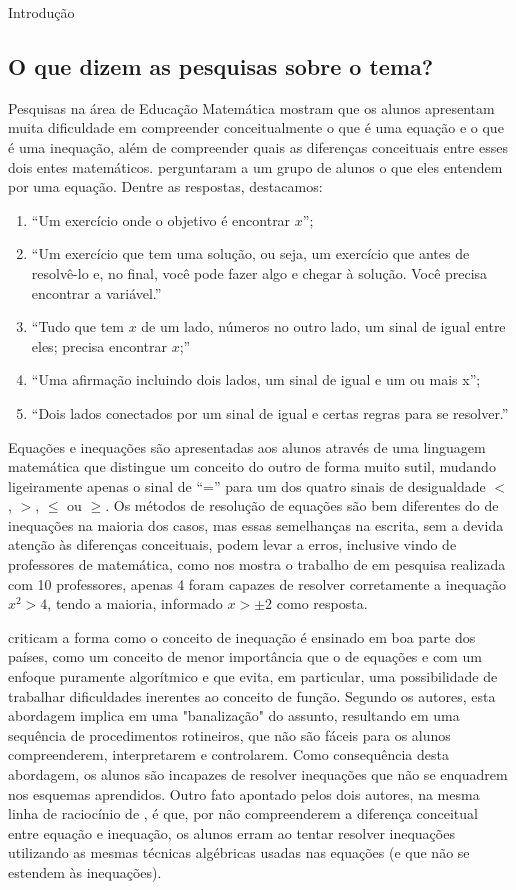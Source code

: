 \begin{apresentacao}{Introdução}
\subsection*{O que dizem as pesquisas sobre o tema?}

Pesquisas na área de Educação Matemática mostram que os alunos apresentam muita dificuldade em compreender conceitualmente o que é uma equação e o que é uma inequação, além de compreender quais as diferenças conceituais entre esses dois entes matemáticos. \cite{Dreyfus2004} perguntaram a um grupo de alunos o que eles entendem por uma equação. Dentre as respostas, destacamos:
\begin{enumerate}
\item “Um exercício onde o objetivo é encontrar $x$”;
\item “Um exercício que tem uma solução, ou seja, um exercício que antes de resolvê-lo e, no final, você pode fazer algo e chegar à solução. Você precisa encontrar a variável.”
\item “Tudo que tem $x$ de um lado, números no outro lado, um sinal de igual entre eles; precisa encontrar $x$;”
\item “Uma afirmação incluindo dois lados, um sinal de igual e um ou mais x”; 
\item  “Dois lados conectados por um sinal de igual e certas regras para se resolver.”{} 
\end{enumerate}


Equações e inequações são apresentadas aos alunos através de uma linguagem matemática que distingue um conceito do outro de forma muito sutil, mudando ligeiramente apenas o sinal de “=”{} para um dos quatro sinais de desigualdade  $<$, $>$, $\leq$ ou $\geq$. Os métodos de resolução de equações são bem diferentes do de inequações na maioria dos casos, mas essas semelhanças na escrita, sem a devida atenção às diferenças conceituais, podem levar a erros, inclusive vindo de professores de matemática, como nos mostra o trabalho de \cite{Lourenco2018} em pesquisa realizada com 10 professores, apenas 4 foram capazes de resolver corretamente a inequação $x^2 >4$, tendo a maioria, informado $x>\pm 2$ como resposta. 

\cite{Boero2004} criticam a forma como o conceito de inequação é ensinado em boa parte dos países, como um conceito de menor importância que o de equações e com um enfoque puramente algorítmico e que evita, em particular, uma possibilidade de trabalhar dificuldades inerentes ao conceito de função. Segundo os autores, esta abordagem implica em uma "banalização"{} do assunto, resultando em uma sequência de procedimentos rotineiros, que não são fáceis para os alunos compreenderem, interpretarem e controlarem. Como consequência desta abordagem, os alunos são incapazes de resolver inequações que não se enquadrem nos esquemas aprendidos. Outro fato apontado pelos dois autores, na mesma linha de raciocínio de \cite{Lourenco2018}, é que, por não compreenderem a diferença conceitual entre equação e inequação, os alunos erram ao tentar resolver inequações utilizando as mesmas técnicas algébricas usadas nas equações (e que não se estendem às inequações).


\end{apresentacao}
